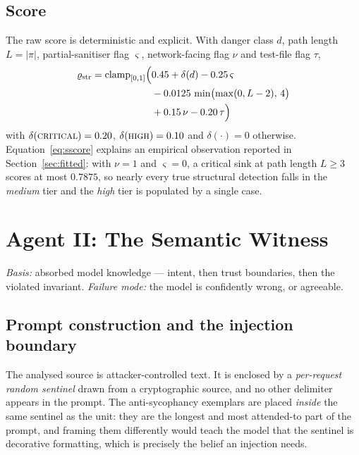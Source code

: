 \documentclass[conference]{IEEEtran}
\newcommand{\clampop}{\operatorname{clamp}}
\begin{document}
\subsection{Score}
The raw score is deterministic and explicit. With danger class $d$, path length $L=|\pi|$,
partial-sanitiser flag $\varsigma$, network-facing flag $\nu$ and test-file flag $\tau$,
\begin{align}
\varrho_{\mathrm{str}} = \clampop_{[0,1]}\Bigl(&0.45 + \delta(d) - 0.25\,\varsigma \nonumber\\
&- 0.0125\,\min\bigl(\max(0, L-2),\,4\bigr) \nonumber\\
&+ 0.15\,\nu - 0.20\,\tau\Bigr)
\label{eq:sscore}
\end{align}
with $\delta(\textsc{critical})=0.20$, $\delta(\textsc{high})=0.10$ and $\delta(\cdot)=0$
otherwise. Equation~\eqref{eq:sscore} explains an empirical observation reported in
Section~\ref{sec:fitted}: with $\nu=1$ and $\varsigma=0$, a critical sink at path length
$L \ge 3$ scores at most $0.7875$, so nearly every true structural detection falls in the
\emph{medium} tier and the \emph{high} tier is populated by a single case.

\section{Agent II: The Semantic Witness}

\emph{Basis:} absorbed model knowledge --- intent, then trust boundaries, then the violated
invariant. \emph{Failure mode:} the model is confidently wrong, or agreeable.

\subsection{Prompt construction and the injection boundary}
The analysed source is attacker-controlled text. It is enclosed by a \emph{per-request random
sentinel} drawn from a cryptographic source, and no other delimiter appears in the prompt.
The anti-sycophancy exemplars are placed \emph{inside} the same sentinel as the unit: they
are the longest and most attended-to part of the prompt, and framing them differently would
teach the model that the sentinel is decorative formatting, which is precisely the belief an
injection needs.
\end{document}
